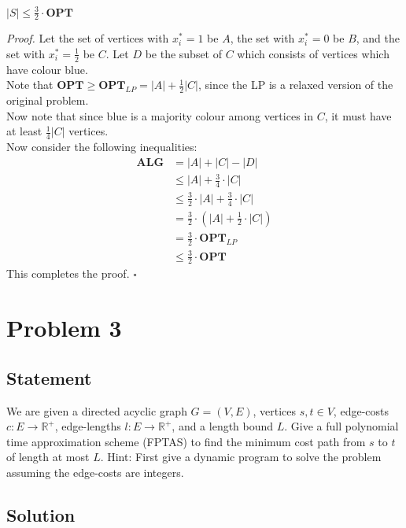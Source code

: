\documentclass[a4paper]{article}
\newenvironment{proof}{\begin{breakbox}\textit{Proof.}}{\hfill$\square$\end{breakbox}}
\newcommand{\nl}{\vspace{0.2cm}\\}
\newcommand{\R}{\mathbb{R}}
\newcommand{\OPT}{\mathbf{OPT}}
\newcommand{\ALG}{\mathbf{ALG}}
\begin{document}
\begin{claim}
    $|S| \le \frac{3}{2} \cdot \OPT$
\end{claim}

\begin{proof}
    Let the set of vertices with $x_i^* = 1$ be $A$, the set with $x_i^* = 0$ be $B$, and the set with $x_i^* = \frac{1}{2}$ be $C$. Let $D$ be the subset of $C$ which consists of vertices
    which have colour blue.\nl
    Note that $\OPT \ge \OPT_{LP} = |A| + \frac{1}{2} |C|$, since the LP is a relaxed version of the original problem.\nl
    Now note that since blue is a majority colour among vertices in $C$, it must have at least $\frac{1}{4} |C|$ vertices.\nl
    Now consider the following inequalities:\nl
    \begin{align*}
        \ALG &= |A| + |C| - |D|\\
             &\le |A| + \frac{3}{4} \cdot |C|\\
             &\le \frac{3}{2} \cdot |A| + \frac{3}{4} \cdot |C|\\
             &= \frac{3}{2} \cdot \left(|A| + \frac{1}{2} \cdot |C|\right)\\
             &= \frac{3}{2} \cdot \OPT_{LP}\\
             &\le \frac{3}{2} \cdot \OPT
    \end{align*}
    This completes the proof.
\end{proof}

\newpage

\section{Problem 3}

\subsection{Statement}

We are given a directed acyclic graph $G = (V, E)$, vertices $s, t \in V$, edge-costs $c : E \to \R^+$, edge-lengths $l : E \to \R^+$, and a length bound $L$. Give a full polynomial time approximation
scheme (FPTAS) to find the minimum cost path from $s$ to $t$ of length at most $L$.  Hint: First give a dynamic program to solve the problem assuming the edge-costs are integers.

\subsection{Solution}
\end{document}
